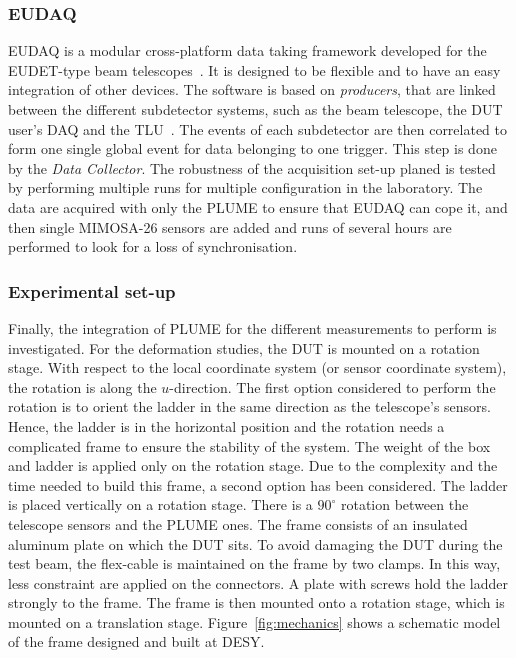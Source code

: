       \subsubsection{EUDAQ}

      EUDAQ is a modular cross-platform data taking framework developed for the EUDET-type beam telescopes~\cite{Jansen}.
      It is designed to be flexible and to have an easy integration of other devices.
      The software is based on \textit{producers}, that are linked between the different subdetector systems, such as the beam telescope, the \gls{DUT} user's DAQ and the \gls{TLU}~\cite{Cussans2009}.
      The events of each subdetector are then correlated to form one single global event for data belonging to one trigger.
      This step is done by the \textit{Data Collector}.
      The robustness of the acquisition set-up planed is tested by performing multiple runs for multiple configuration in the laboratory.
      The data are acquired with only the \gls{PLUME} to ensure that EUDAQ can cope it, and then single \gls{MIMOSA}-26 sensors are added and runs of several hours are performed to look for a loss of synchronisation.

      \subsubsection{Experimental set-up}

      Finally, the integration of \gls{PLUME} for the different measurements to perform is investigated.
      For the deformation studies, the \gls{DUT} is mounted on a rotation stage. 
      With respect to the local coordinate system (or sensor coordinate system), the rotation is along the $u$-direction. 
      The first option considered to perform the rotation is to orient the ladder in the same direction as the telescope's sensors. 
      Hence, the ladder is in the horizontal position and the rotation needs a complicated frame to ensure the stability of the system.
      The weight of the box and ladder is applied only on the rotation stage. 
      Due to the complexity and the time needed to build this frame, a second option has been considered.
      The ladder is placed vertically on a rotation stage. 
      There is a $90^{\circ}$ rotation between the telescope sensors and the \gls{PLUME} ones.
      The frame consists of an insulated aluminum plate on which the \gls{DUT} sits.
      To avoid damaging the \gls{DUT} during the test beam, the flex-cable is maintained on the frame by two clamps.
      In this way, less constraint are applied on the connectors. 
      A plate with screws hold the ladder strongly to the frame.
      The frame is then mounted onto a rotation stage, which is mounted on a translation stage.
      Figure~\ref{fig:mechanics} shows a schematic model of the frame designed and built at DESY.
      
